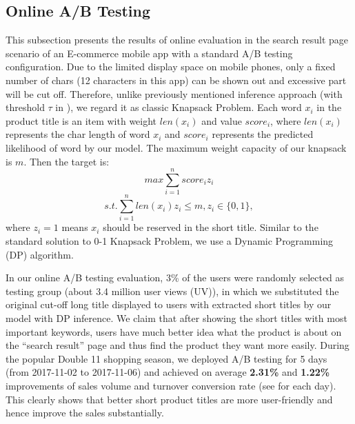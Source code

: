 \subsection{Online A/B Testing}
\label{sec:eval_online}
This subsection presents the results of online evaluation in the search result page scenario
of an E-commerce mobile app with a standard A/B testing configuration.
Due to the limited display space on mobile phones,
only a fixed number of chars (12 characters in this app) 
can be shown out and excessive part will be cut off.
Therefore, unlike previously mentioned inference approach (with threshold $\tau$ in ),
we regard it as classic Knapsack Problem.
Each word $x_i$ in the product title is an item with weight $len(x_i)$ and value $score_i$,
where $len(x_i)$ represents the char length of word $x_i$
and $score_i$ represents the predicted likelihood of word by our model.
The maximum weight capacity of our knapsack is $m$. 
Then the target is:
$$
max \sum_{i=1}^{n} score_i z_i 
$$
$$
s.t. \sum_{i=1}^{n} len(x_i)z_i \le m, z_i \in \{0, 1\}, 
$$
where $z_i=1$ means $x_i$ should be reserved in the short title.
Similar to the standard solution to 0-1 Knapsack Problem,
we use a Dynamic Programming (DP) algorithm. %

In our online A/B testing evaluation,
3\% of the users were randomly selected as testing group (about 3.4 million user views (UV)),
in which we substituted the original cut-off long title displayed to users
with extracted short titles by our model with DP inference.
We claim that after showing the short titles with most important keywords,
users have much better idea what the product is about on the 
``search result'' page and thus find the product they want more easily.
During the popular Double 11 shopping season, 
we deployed A/B testing for 5 days (from 2017-11-02 to 2017-11-06) 
and achieved on average \textbf{2.31\%} and \textbf{1.22\%} improvements of 
sales volume and turnover conversion rate (see  for each day).
This clearly shows that better short product titles are more user-friendly
and hence improve the sales substantially.

